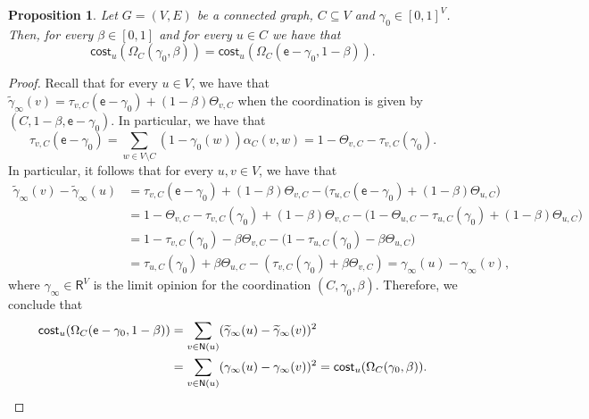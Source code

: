 \documentclass[letterpaper,11pt]{article}
\newcommand{\RR}{\mathsf{R}}
\newcommand{\nsf}{\mathsf{N}}
\newcommand{\cost}{\mathsf{cost}}
\newtheorem{proposition}{Proposition}
\begin{document}
\begin{proposition}
\label{prop:spin}
Let $G=(V,E)$ be a connected graph, $C\subseteq V$ and $\gamma_0\in [0,1]^V$.
Then, for every $\beta \in [0,1]$ and for every $u\in C$ we have that 
\begin{equation*}
\cost_u(\Omega_C(\gamma_0,\beta))=\cost_u(\Omega_C(\mathsf{e}-\gamma_0,1-\beta)).
\end{equation*}
\end{proposition}

\begin{proof}
Recall that for every $u\in V$, we have that $\widetilde \gamma_{\infty}(v)=\tau_{v,C}(\mathsf{e}-\gamma_0)+(1-\beta)\Theta_{v,C}$ when the coordination is given by $(C,1-\beta,\mathsf{e}-\gamma_0)$.
In particular, we have that 
\begin{equation*}
\tau_{v,C}(\mathsf{e}-\gamma_0)=\sum_{w\in V\setminus C}(1-\gamma_0(w))\alpha_C(v,w)=1-\Theta_{v,C}-\tau_{v,C}(\gamma_0).
\end{equation*}
In particular, it follows that for every $u,v\in V$, we have that 
\begin{align*}
\widetilde \gamma_{\infty}(v)-\widetilde \gamma_{\infty}(u)&=\tau_{v,C}(\mathsf{e}-\gamma_0)+(1-\beta)\Theta_{v,C}-\Big(\tau_{u,C}(\mathsf{e}-\gamma_0)+(1-\beta)\Theta_{u,C}\Big)\\
&=1-\Theta_{v,C}-\tau_{v,C}(\gamma_0)+(1-\beta)\Theta_{v,C}-\Big(1-\Theta_{u,C}-\tau_{u,C}(\gamma_0)+(1-\beta)\Theta_{u,C}\Big)\\
&=1-\tau_{v,C}(\gamma_0)-\beta\Theta_{v,C}-\Big(1-\tau_{u,C}(\gamma_0)-\beta\Theta_{u,C}\Big)\\
&=\tau_{u,C}(\gamma_0)+\beta\Theta_{u,C}-(\tau_{v,C}(\gamma_0)+\beta\Theta_{v,C})=\gamma_{\infty}(u)-\gamma_{\infty}(v),
\end{align*}
where $\gamma_{\infty}\in \RR^V$ is the limit opinion for the coordination $(C,\gamma_0,\beta)$.
Therefore, we conclude that 
\begin{align*}
\cost_u(\Omega_C(\mathsf{e}-\gamma_0,1-\beta))&=\sum_{v\in \nsf(u)}(\widetilde \gamma_{\infty}(u)-\widetilde \gamma_{\infty}(v))^2\\
&=\sum_{v\in \nsf(u)}(\gamma_{\infty}(u)-\gamma_{\infty}(v))^2=\cost_u(\Omega_C(\gamma_0,\beta)).\qedhere
\end{align*}
\end{proof}
\end{document}
